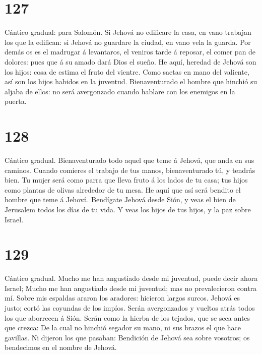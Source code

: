 \hypertarget{section-126}{%
\section{127}\label{section-126}}

 Cántico gradual: para Salomón. Si Jehová no edificare la
casa, en vano trabajan los que la edifican: si Jehová no guardare la
ciudad, en vano vela la guarda.  Por demás os es el
madrugar á levantaros, el veniros tarde á reposar, el comer pan de
dolores: pues que á su amado dará Dios el sueño.  He aquí,
heredad de Jehová son los hijos: cosa de estima el fruto del vientre.
 Como saetas en mano del valiente, así son los hijos
habidos en la juventud.  Bienaventurado el hombre que
hinchió su aljaba de ellos: no será avergonzado cuando hablare con los
enemigos en la puerta.

\hypertarget{section-127}{%
\section{128}\label{section-127}}

 Cántico gradual. Bienaventurado todo aquel que teme á
Jehová, que anda en sus caminos.  Cuando comieres el
trabajo de tus manos, bienaventurado tú, y tendrás bien. 
Tu mujer será como parra que lleva fruto á los lados de tu casa; tus
hijos como plantas de olivas alrededor de tu mesa.  He
aquí que así será bendito el hombre que teme á Jehová. 
Bendígate Jehová desde Sión, y veas el bien de Jerusalem todos los días
de tu vida.  Y veas los hijos de tus hijos, y la paz sobre
Israel.

\hypertarget{section-128}{%
\section{129}\label{section-128}}

 Cántico gradual. Mucho me han angustiado desde mi
juventud, puede decir ahora Israel;  Mucho me han
angustiado desde mi juventud; mas no prevalecieron contra mí.
 Sobre mis espaldas araron los aradores: hicieron largos
surcos.  Jehová es justo; cortó las coyundas de los
impíos.  Serán avergonzados y vueltos atrás todos los que
aborrecen á Sión.  Serán como la hierba de los tejados,
que se seca antes que crezca:  De la cual no hinchió
segador su mano, ni sus brazos el que hace gavillas.  Ni
dijeron los que pasaban: Bendición de Jehová sea sobre vosotros; os
bendecimos en el nombre de Jehová.

